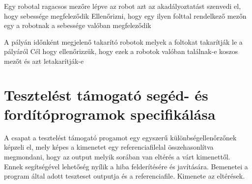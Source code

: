 %
{Egy robotal ragacsos mezőre lépve az robot azt az akadályoztatást szenvedi el, hogy sebessége megfeleződik}%
{Ellenőrizni, hogy egy ilyen folttal rendelkező mezőn egy a robotnak a sebessége valóban megfeleződik}

%
{A pályán időnként megjelenő takarító robotok melyek a foltokat takarítják le a pályáról}%
{Cél hogy ellenőrizzük, hogy ezek a robotok valóban találnak-e koszos mezőt és azt letakarítják-e}

\section{Tesztelést támogató segéd- és fordítóprogramok specifikálása}
A csapat a tesztelést támogató progamot egy egyszerű különbségellenőrzőnek képzeli el, mely képes a kimenetet egy referenciafilelal összehasonlítva megmondani,
hogy az output melyik sorában van eltérés a várt kimenettől. Ennek segítségével lehetőség nyílik a hiba felderítésére és javítására. Bemenetei a program által adott
teszteset outputja és a referenciafile. Kimenete az eltérések. 

